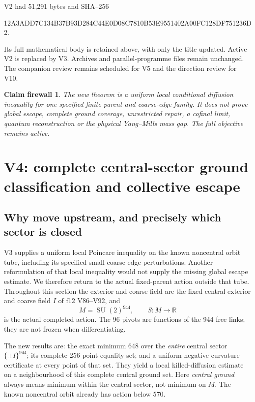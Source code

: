 \documentclass[11pt,oneside]{article}
\newtheorem{firewall}[theorem]{Claim firewall}
\DeclareMathOperator{\SU}{SU}
\begin{document}
V2 had 51,291 bytes and
SHA--256
\begin{center}\scriptsize\ttfamily
12A3ADD7C134B37B93D284C44E0D08C7810B53E9551402A00FC128DF751236D2.
\end{center}
Its full mathematical body
is retained above, with
only the title updated.
Active V2 is replaced
by V3. Archives and
parallel-programme files
remain unchanged.
The companion review
remains scheduled for
V5 and the direction
review for V10.

\begin{firewall}
The new theorem is a
uniform local conditional
diffusion inequality for
one specified finite
parent and coarse-edge
family. It does not prove
global escape, complete
ground coverage, unrestricted
repair, a cofinal limit,
quantum reconstruction
or the physical
Yang--Mills mass gap.
The full objective
remains active.
\end{firewall}
\section{V4: complete central-sector ground classification and collective escape}
\label{sec:f13v4}

\subsection{Why move upstream, and precisely which sector is closed}

V3 supplies a uniform local Poincare inequality on the known
noncentral orbit tube, including its specified small coarse-edge
perturbations. Another reformulation of that local inequality would
not supply the missing global escape estimate. We therefore return
to the actual fixed-parent action outside that tube. Throughout
this section the exterior and coarse field are the fixed central
exterior and coarse field \(I\) of f12 V86--V92, and
\[
 M=\SU(2)^{944},\qquad S:M\longrightarrow\mathbb R
\]
is the actual completed action. The 96 pivots are functions of
the 944 free links; they are not frozen when differentiating.

The new results are: the exact minimum \(648\) over the
\emph{entire} central sector \(\{\pm I\}^{944}\); its complete
256-point equality set; and a uniform negative-curvature
certificate at every point of that set. They yield a local
killed-diffusion estimate on a neighbourhood of this complete
central ground set. Here \emph{central ground} always means
minimum within the central sector, not minimum on \(M\).
The known noncentral orbit already has action below \(570\).
\end{document}
